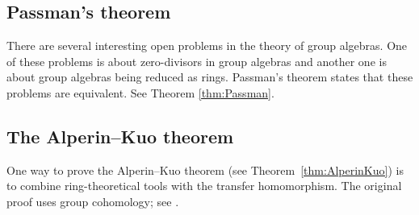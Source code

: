 \subsection*{Passman's theorem}

There are several interesting open problems in the theory of group algebras. One 
of these problems is about zero-divisors in group algebras and another one 
is about group algebras being reduced as rings. Passman's theorem states
that these problems are equivalent. See Theorem \ref{thm:Passman}. 

\subsection*{The Alperin--Kuo theorem}

One way to prove the Alperin--Kuo theorem (see Theorem~\ref{thm:AlperinKuo}) 
is to combine 
ring-theoretical tools with the transfer homomorphism. The original 
proof uses group cohomology; see \cite{MR214674}. 
